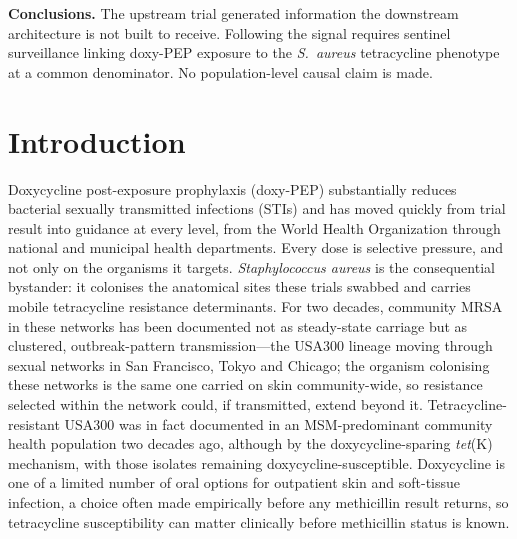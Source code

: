 \documentclass[12pt,a4paper]{article}
\newcommand{\sa}{\emph{S.~aureus}}
\newcommand{\Sa}{\emph{Staphylococcus aureus}}
\begin{document}
\noindent\textbf{Conclusions.} The upstream trial generated information the
downstream architecture is not built to receive. Following the signal requires
sentinel surveillance linking doxy-PEP exposure to the \sa{} tetracycline
phenotype at a common denominator. No population-level causal claim is made.

\vspace{1em}
\linenumbers

\section*{Introduction}

Doxycycline post-exposure prophylaxis (doxy-PEP) substantially reduces bacterial
sexually transmitted infections (STIs) and has moved quickly from trial result
into guidance at every level, from the World Health Organization through national
and municipal health departments.\cite{luetkemeyer2023,cdc2024doxypep} Every dose
is selective pressure, and not only on the organisms it targets. \Sa{} is the
consequential bystander: it colonises the anatomical sites these trials swabbed
and carries mobile tetracycline resistance determinants.\cite{grossman2016} For
two decades, community MRSA in these networks has been documented not as
steady-state carriage but as clustered, outbreak-pattern transmission---the
USA300 lineage moving through sexual networks in San Francisco, Tokyo and
Chicago\cite{diep2008,dejong2025}; the organism colonising these networks is the
same one carried on skin community-wide, so resistance selected within the
network could, if transmitted, extend beyond it. Tetracycline-resistant USA300
was in fact documented in an MSM-predominant community health population two
decades ago, although by the doxycycline-sparing \emph{tet}(K) mechanism, with
those isolates remaining doxycycline-susceptible.\cite{han2007} Doxycycline is
one of a limited number of oral options for outpatient skin and soft-tissue
infection, a choice often made empirically before any methicillin result
returns,\cite{stevens2014,liu2011} so tetracycline susceptibility can matter
clinically before methicillin status is known.
\end{document}
